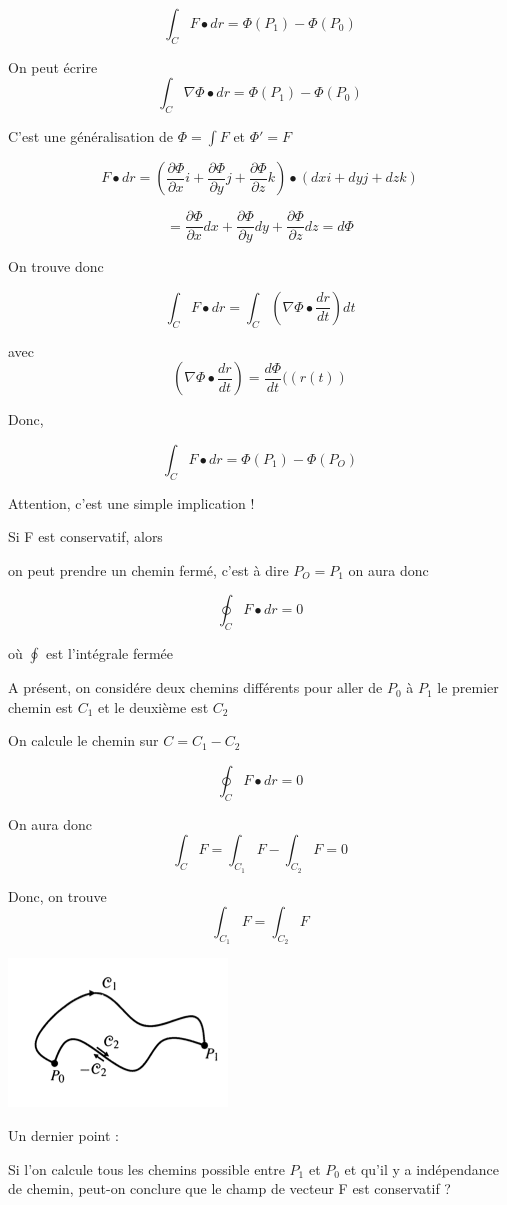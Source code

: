 \[\int_C F\bullet dr = \Phi ( P_1 ) - \Phi ( P_0) \]

On peut écrire
\[\int_C \nabla \Phi \bullet dr =  \Phi ( P_1 ) - \Phi ( P_0) \]

C'est une généralisation de $\Phi = \int F $ et $\Phi ' = F $

\[F\bullet dr = \left( \frac{\partial \Phi }{\partial x} i + \frac{\partial \Phi }{\partial y} j +\frac{\partial \Phi }{\partial z} k \right)\bullet (  dx i + dy j + dz k )\]

\[=\frac{\partial \Phi}{\partial x}dx + \frac{\partial \Phi}{\partial y}dy +\frac{\partial \Phi}{\partial z}dz = d\Phi\]

On trouve donc

\[\int_C F\bullet dr = \int_C ( \nabla \Phi \bullet \frac{dr}{dt} ) dt \]

avec \[( \nabla \Phi \bullet \frac{dr}{dt} )= \frac{d\Phi}{dt}((r(t))\]

Donc,

\[\int_C F\bullet dr = \Phi ( P_1 ) - \Phi ( P_O) \]

Attention, c'est une simple implication !

Si F est conservatif, alors

on peut prendre un chemin fermé, c'est à dire $P_O = P_1$ on aura donc

\[\oint _C F\bullet dr = 0\]

où $ \oint $ est l'intégrale fermée

A présent, on considére deux chemins différents pour aller de $P_0$ à $P_1$ le premier chemin est $C_1$ et le deuxième est $C_2$

On calcule le chemin sur $C = C_1-C_2$

\[\oint _C F\bullet dr = 0\]

On aura donc \[\int_C F = \int_{C_1} F - \int_{C_2} F = 0\]

Donc, on trouve
\[\int_{C_1} F = \int_{C_2} F \]

\includegraphics[scale=1]{image3.png}

Un dernier point :

Si l'on calcule tous les chemins possible entre $P_1$ et $P_0$ et qu'il y a indépendance de chemin, peut-on conclure que le champ de vecteur F est conservatif ?

